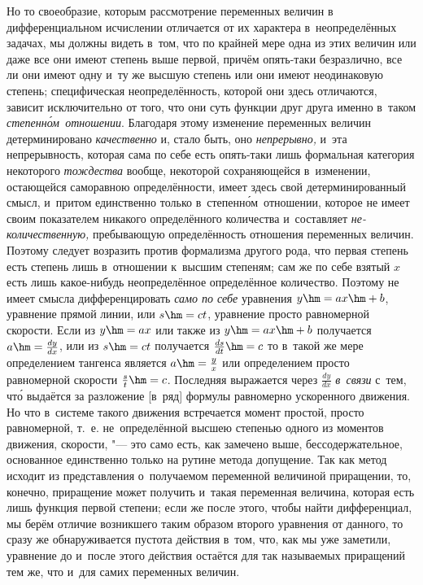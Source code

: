 \label{bkm:bm53c}Но то своеобразие, которым рассмотрение переменных величин в
дифференциальном исчислении отличается от их характера в~неопределённых
задачах, мы должны видеть в~том, что по крайней мере одна из этих величин или
даже все они имеют степень выше первой, причём опять-таки безразлично, все ли
они имеют одну и~ту же высшую степень или они имеют неодинаковую степень;
специфическая неопределённость, которой они здесь отличаются, зависит
исключительно от того, что они суть функции друг друга именно в~таком
{\em степенн\'{о}м~отношении}. Благодаря этому изменение переменных величин
детерминировано {\em качественно} и, стало быть, оно {\em непрерывно,} и~эта
непрерывность, которая сама по себе есть опять-таки лишь формальная категория
некоторого {\em тождества} вообще, некоторой сохраняющейся в~изменении,
остающейся саморавною определённости, имеет здесь свой детерминированный смысл,
и~притом единственно только в~степенн\'{о}м~отношении, которое не имеет своим
показателем никакого определённого количества и~составляет
{\em не-количественную,} пребывающую определённость отношения переменных
величин. Поэтому следует возразить против формализма другого рода, что первая
степень есть степень лишь в~отношении к~высшим степеням; сам же по себе взятый
$x$ есть лишь какое-нибудь неопределённое определённое количество. Поэтому
не имеет смысла дифференцировать {\em само по себе} уравнения $y\hm=ax\hm+b$,
уравнение прямой линии, или $s\hm=ct$, уравнение просто равномерной скорости.
Если из $y\hm=ax$ или также из $y\hm=ax\hm+b$ получается $a\hm=\frac{dy}{dx}$,
или из $s\hm=ct$ получается $\frac{ds}{dt}\hm=c$ то в~такой же мере
определением тангенса является $a\hm=\frac y x$ или определением просто
равномерной скорости $\frac s t\hm=c$. Последняя выражается через
$\frac{dy}{dx}$ {\em в~связи} с~тем, чт\'{о} выдаётся за разложение [в~ряд]
формулы равномерно ускоренного движения. Но что в~системе такого движения
встречается момент простой, просто равномерной, т.~е. не~определённой высшею
степенью одного из моментов движения, скорости, "--- это само есть, как
замечено выше, бессодержательное, основанное единственно только на рутине
метода допущение. Так как метод исходит из представления о~получаемом
переменной величиной приращении, то, конечно, приращение может получить и~такая
переменная величина, которая есть лишь функция первой степени; если же после
этого, чтобы найти дифференциал, мы берём отличие возникшего таким образом
второго уравнения от данного, то сразу же обнаруживается пустота действия
в~том, что, как мы уже заметили, уравнение до и~после этого действия остаётся
для так называемых приращений тем же, что и~для самих переменных величин.

